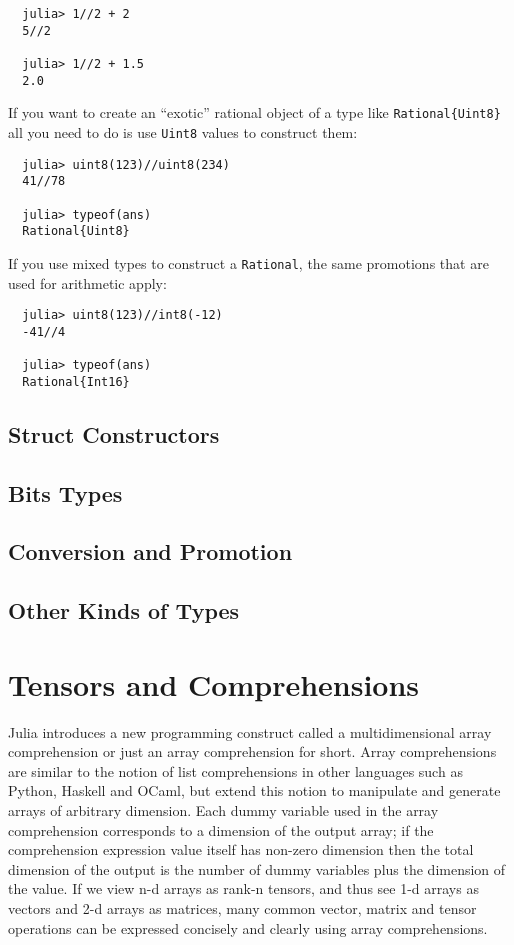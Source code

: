 \documentclass{article}
\renewcommand{\sec}[1]{\label{sec:#1}}
\begin{document}
\begin{verbatim}
  julia> 1//2 + 2
  5//2

  julia> 1//2 + 1.5
  2.0
\end{verbatim}
If you want to create an ``exotic'' rational object of a type like \verb|Rational{Uint8}| all you need to do is use \verb|Uint8| values to construct them:
\begin{verbatim}
  julia> uint8(123)//uint8(234)
  41//78

  julia> typeof(ans)
  Rational{Uint8}
\end{verbatim}
If you use mixed types to construct a \verb|Rational|, the same promotions that are used for arithmetic apply:
\begin{verbatim}
  julia> uint8(123)//int8(-12)
  -41//4

  julia> typeof(ans)
  Rational{Int16}
\end{verbatim}

\subsection{Struct Constructors}\sec{struct-constructors}

\subsection{Bits Types}

\subsection{Conversion and Promotion}\sec{conversion-and-promotion}

\subsection{Other Kinds of Types}

\section{Tensors and Comprehensions}

Julia introduces a new programming construct called a multidimensional
array comprehension or just an array comprehension for short. Array
comprehensions are similar to the notion of list comprehensions in
other languages such as Python, Haskell and OCaml, but extend this
notion to manipulate and generate arrays of arbitrary dimension. Each
dummy variable used in the array comprehension corresponds to a
dimension of the output array; if the comprehension expression value
itself has non-zero dimension then the total dimension of the output
is the number of dummy variables plus the dimension of the value. If
we view n-d arrays as rank-n tensors, and thus see 1-d arrays as
vectors and 2-d arrays as matrices, many common vector, matrix and
tensor operations can be expressed concisely and clearly using array
comprehensions.
\end{document}
